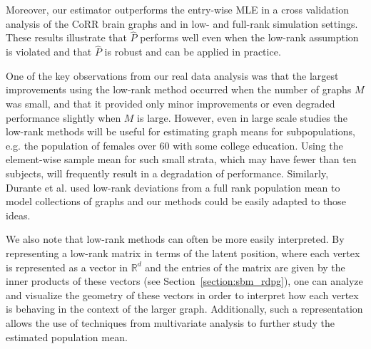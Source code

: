 \documentclass[10pt,letterpaper]{article}
\renewcommand{\Re}{\mathbb{R}}
\renewcommand{\hat}{\widehat}
\begin{document}
Moreover, our estimator outperforms the entry-wise MLE in a cross validation analysis of the CoRR brain graphs and in low- and full-rank simulation settings.
These results illustrate that $\hat{P}$ performs well even when the low-rank assumption is violated and that $\hat{P}$ is robust and can be applied in practice.

One of the key observations from our real data analysis was that the largest improvements using the low-rank method occurred when the number of graphs $M$ was small, and that it provided only minor improvements or even degraded performance slightly when $M$ is large. 
However, even in large scale studies the low-rank methods will be useful for estimating graph means for subpopulations, e.g. the population of females over 60 with some college education.
Using the element-wise sample mean for such small strata, which may have fewer than ten subjects, will frequently result in a degradation of performance.
Similarly, Durante et al. \cite{durante2014nonparametric} used low-rank deviations from a full rank population mean to model collections of graphs and our methods could be easily adapted to those ideas.

We also note that low-rank methods can often be more easily interpreted.
By representing a low-rank matrix in terms of the latent position, where each vertex is represented as a vector in $\Re^d$ and the entries of the matrix are given by the inner products of these vectors (see Section~\ref{section:sbm_rdpg}), one can analyze and visualize the geometry of these vectors in order to interpret how each vertex is behaving in the context of the larger graph. 
Additionally, such a representation allows the use of techniques from multivariate analysis to further study the estimated population mean.




\end{document}
